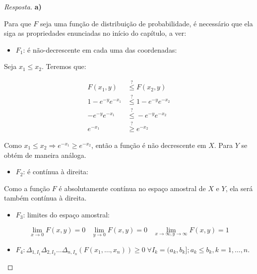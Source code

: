 \documentclass[
]{article}
\providecommand{\tightlist}{%
  \setlength{\itemsep}{0pt}\setlength{\parskip}{0pt}}
\theoremstyle{definition}
\theoremstyle{definition}
\theoremstyle{definition}
\theoremstyle{definition}
\theoremstyle{remark}
\begin{document}
\begin{proof}[Resposta]
\textbf{a)}

Para que \(F\) seja uma função de distribuição de probabilidade, é necessário que ela siga as propriedades enunciadas no início do capítulo, a ver:

\begin{itemize}
\tightlist
\item
  \(F_{1}\): é não-decrescente em cada uma das coordenadas:
\end{itemize}

Seja \(x_{1} \le x_{2}\). Teremos que:

\begin{align*}
F(x_{1},y) &\stackrel{?}{\le} F(x_{2},y) \\
1 - e^{-y}e^{-x_{1}} &\stackrel{?}{\le} 1 - e^{-y}e^{-x_{2}} \\
-e^{-y}e^{-x_{1}} &\stackrel{?}{\le} -e^{-y}e^{-x_{2}} \\
e^{-x_{1}} &\stackrel{?}{\ge} e^{-x_{2}}
\end{align*}

Como \(x_{1} \le x_{2} \Rightarrow e^{-x_{1}} \ge e^{-x_{2}}\), então a função é não decrescente em \(X\). Para \(Y\) se obtém de maneira análoga.

\begin{itemize}
\tightlist
\item
  \(F_{2}\): é contínua à direita:
\end{itemize}

Como a função \(F\) é absolutamente contínua no espaço amostral de \(X\) e \(Y\), ela será também contínua à direita.

\begin{itemize}
\tightlist
\item
  \(F_{3}\): limites do espaço amostral:
\end{itemize}

\begin{equation*}
\lim_{x \to 0}F(x,y) = 0 \;\;\; \lim_{y \to 0}F(x,y) = 0 \;\;\; \lim_{x \to \infty,y \to \infty}F(x,y) = 1
\end{equation*}

\begin{itemize}
\tightlist
\item
  \(F_{4}: \Delta_{1,I_{1}}\Delta_{2,I_{2}}\ldots\Delta_{n,I_{n}}(F(x_{1},\ldots,x_{n})) \ge 0 \; \forall I_{k} = (a_{k}, b_{k}]; a_{k} \le b_{k}, k=1,\ldots,n\).
\end{itemize}


\end{proof}
\end{document}
